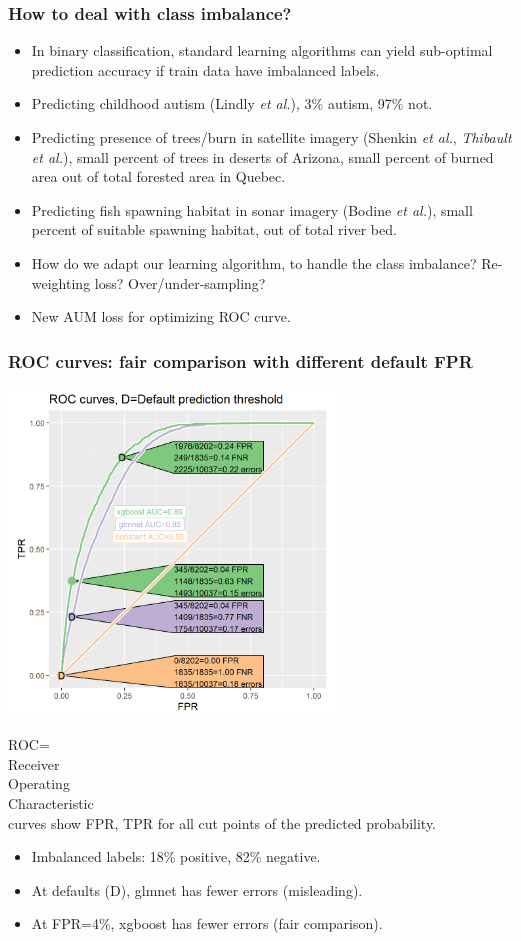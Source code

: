 \documentclass{beamer}
\begin{document}
\begin{frame}
  \frametitle{How to deal with class imbalance?}
  \begin{itemize}
  \item In binary classification, standard learning algorithms can yield sub-optimal prediction accuracy if train data have imbalanced labels.
  \item Predicting childhood autism (Lindly \emph{et al.}), 3\% autism, 97\% not.
  \item Predicting presence of trees/burn in satellite imagery
    (Shenkin \emph{et al.}, \emph{Thibault} \emph{et al.}), small
    percent of trees in deserts of Arizona, small percent of burned
    area out of total forested area in Quebec.
  \item Predicting fish spawning habitat in sonar imagery (Bodine
    \emph{et al.}), small percent of suitable spawning habitat, out of
    total river bed.
  \item How do we adapt our learning algorithm, to handle the class
    imbalance? Re-weighting loss? Over/under-sampling?
  \item \alert{New AUM loss
      for optimizing ROC curve.}
  \end{itemize}
\end{frame}

\begin{frame} \frametitle{ROC curves: fair comparison with different
    default FPR} \parbox{0.65\textwidth}{
    \includegraphics[width=0.65\textwidth]{figure-batchtools-expired-earth-roc}
  } \parbox{0.3\textwidth}{ROC=\\Receiver\\ Operating\\ Characteristic\\ curves
    show FPR, TPR for all cut points of the predicted probability.
  }
  \begin{itemize}
  \item Imbalanced labels: 18\% positive, 82\% negative.
  \item At defaults (D), glmnet has fewer errors (misleading).
  \item At FPR=4\%, xgboost has fewer errors (fair comparison).
  \end{itemize}
\end{frame}
\end{document}
